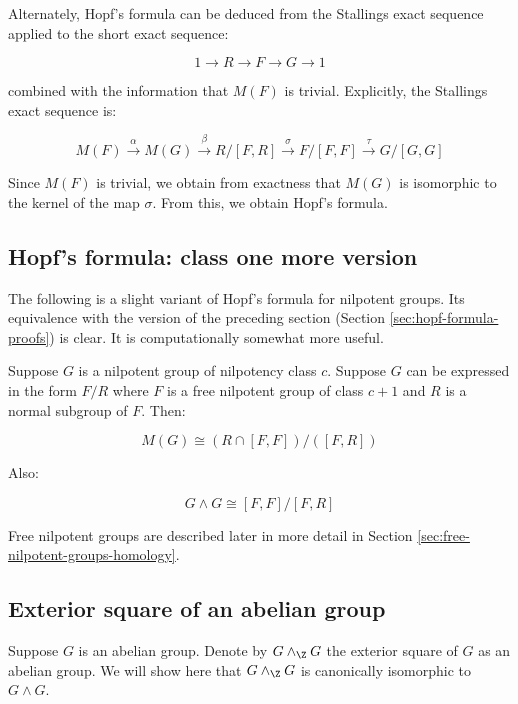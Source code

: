 \documentclass{ucetd}
\begin{document}
Alternately, Hopf's formula can be deduced from the Stallings exact
sequence applied to the short exact sequence:

$$1 \to R \to F \to G \to 1$$

combined with the information that $M(F)$ is trivial. Explicitly,
the Stallings exact sequence is:

$$M(F) \stackrel{\alpha}{\to} M(G) \stackrel{\beta}{\to} R/[F,R] \stackrel{\sigma}{\to} F/[F,F] \stackrel{\tau}{\to} G/[G,G]$$

Since $M(F)$ is trivial, we obtain from exactness that $M(G)$ is
isomorphic to the kernel of the map $\sigma$. From this, we obtain
Hopf's formula.

\subsection{Hopf's formula: class one more version}\label{sec:hopf-formula-class-one-more}

The following is a slight variant of Hopf's formula for nilpotent
groups. Its equivalence with the version of the preceding section
(Section \ref{sec:hopf-formula-proofs}) is clear. It is
computationally somewhat more useful.

Suppose $G$ is a nilpotent group of nilpotency class $c$. Suppose $G$
can be expressed in the form $F/R$ where $F$ is a free nilpotent group
of class $c + 1$ and $R$ is a normal subgroup of $F$. Then:

\begin{equation}\label{eq:hopf-formula-class-one-more}
  M(G) \cong (R \cap [F,F])/([F,R])
\end{equation}

Also:

\begin{equation}\label{eq:exteriorsquare-hopf-formula-class-one-more}
  G \wedge G \cong [F,F]/[F,R]
\end{equation}

Free nilpotent groups are described later in more detail in Section
\ref{sec:free-nilpotent-groups-homology}.

\subsection{Exterior square of an abelian group}\label{sec:exteriorsquare-abelian-group-intro}

Suppose $G$ is an abelian group. Denote by $G \wedge_\Z G$ the
exterior square of $G$ as an abelian group. We will show here that $G
\wedge_\Z G$ is canonically isomorphic to $G \wedge G$.
\end{document}
